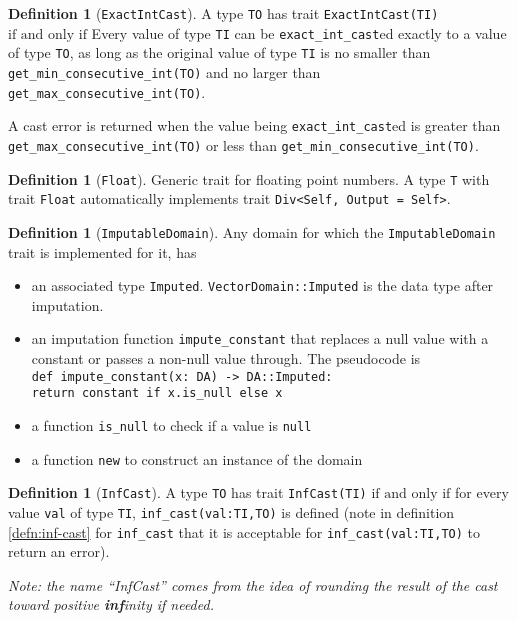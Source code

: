 \documentclass[11pt,a4paper]{article}
\theoremstyle{definition}
\newtheorem{definition}[theorem]{Definition}
\newcommand{\iffText}{\text{if and only if}}
\begin{document}
\begin{definition}[\texttt{ExactIntCast}]
    A type \texttt{TO} has trait \texttt{ExactIntCast(TI)} $\iffText$ Every value of type \texttt{TI} can be \texttt{exact\_int\_cast}ed exactly to a value of type \texttt{TO}, as long as the original value of type \texttt{TI} is no smaller than \texttt{get\_min\_consecutive\_int(TO)} and no larger than \texttt{get\_max\_consecutive\_int(TO)}.
    
    A cast error is returned when the value being \texttt{exact\_int\_cast}ed is greater than \texttt{get\_max\_consecutive\_int(TO)} or less than \texttt{get\_min\_consecutive\_int(TO)}.
\end{definition}

\begin{definition}[\texttt{Float}]
    Generic trait for floating point numbers. A type \texttt{T} with trait \texttt{Float} automatically implements trait \texttt{Div<Self, Output = Self>}.
\end{definition}

\begin{definition}[\texttt{ImputableDomain}] 
Any domain for which the \texttt{ImputableDomain} trait is implemented for it, has 
\begin{itemize}
    \item an associated type \texttt{Imputed}. \texttt{VectorDomain::Imputed} is the data type after imputation. 
    \item an imputation function \texttt{impute\_constant} that replaces a null value with a constant or passes a non-null value through. The pseudocode is \\
    \texttt{def impute\_constant(x: DA) -> DA::Imputed: \\ return constant if x.is\_null else x}
    \item  a function \texttt{is\_null} to check if a value is \texttt{null}
    \item a function \texttt{new} to construct an instance of the domain
\end{itemize}

\end{definition}

\begin{definition}[\texttt{InfCast}]
A type \texttt{TO} has trait \texttt{InfCast(TI)} $\iffText$ for every value \texttt{val} of type \texttt{TI}, \texttt{inf\_cast(val:TI,TO)} is defined (note in definition \ref{defn:inf-cast} for \texttt{inf\_cast} that it is acceptable for \texttt{inf\_cast(val:TI,TO)} to return an error).

\emph{Note: the name ``InfCast'' comes from the idea of rounding the result of the cast toward positive \textbf{inf}inity if needed.}
\end{definition}
\end{document}
